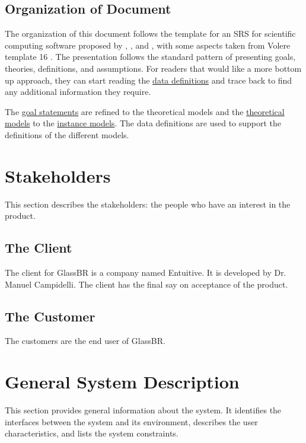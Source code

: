 \documentclass[12pt]{article}
\begin{document}
\subsection{Organization of Document}
\label{Sec:DocOrg}
The organization of this document follows the template for an SRS for scientific computing software proposed by \cite{koothoor2013}, \cite{smithLai2005}, \cite{smithEtAl2007} and \cite{smithKoothoor2016}, with some aspects taken from Volere template 16 \cite{rbrtsn2012}. The presentation follows the standard pattern of presenting goals, theories, definitions, and assumptions. For readers that would like a more bottom up approach, they can start reading the \hyperref[Sec:IMs]{data definitions} and trace back to find any additional information they require.

The \hyperref[Sec:GoalStmt]{goal statements} are refined to the theoretical models and the \hyperref[Sec:TMs]{theoretical models} to the \hyperref[Sec:IMs]{instance models}. The data definitions are used to support the definitions of the different models.

\section{Stakeholders}
\label{Sec:Stakeholder}
This section describes the stakeholders: the people who have an interest in the product.

\subsection{The Client}
\label{Sec:Client}
The client for GlassBR is a company named Entuitive. It is developed by Dr. Manuel Campidelli. The client has the final say on acceptance of the product.

\subsection{The Customer}
\label{Sec:Customer}
The customers are the end user of GlassBR.

\section{General System Description}
\label{Sec:GenSysDesc}
This section provides general information about the system. It identifies the interfaces between the system and its environment, describes the user characteristics, and lists the system constraints.
\end{document}
